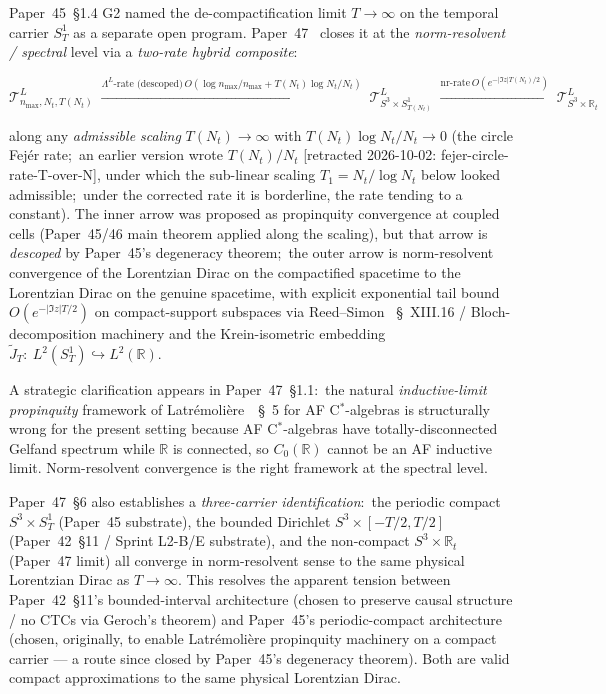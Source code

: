 \documentclass[11pt,a4paper]{article}
\theoremstyle{plain}
\theoremstyle{definition}
\newcommand{\nmax}{n_{\max}}
\newcommand{\Nt}{N_{t}}
\newcommand{\sthree}{S^{3}}
\newcommand{\Tcal}{\mathcal{T}}
\newcommand{\R}{\mathbb{R}}
\newcommand{\Lprop}{\Lambda^{L}}
\newcommand{\Sone}{S^{1}}
\begin{document}
Paper~45~\S 1.4 G2 named the de-compactification limit
$T \to \infty$ on the temporal carrier $\Sone_{T}$ as a separate
open program.  Paper~47~\cite{paper47} closes it at the \emph{norm-resolvent / spectral} level via a \emph{two-rate hybrid composite}:

\begin{equation}\label{eq:p47_composite}
\Tcal^{L}_{\nmax, \Nt, T(\Nt)}
\;\xrightarrow{\Lprop\text{-rate (descoped)}\,
O(\log\nmax/\nmax + T(\Nt)\log\Nt/\Nt)}\;
\Tcal^{L}_{\sthree \times \Sone_{T(\Nt)}}
\;\xrightarrow{\mathrm{nr}\text{-rate}\,
O(e^{-|\Im z|T(\Nt)/2})}\;
\Tcal^{L}_{\sthree \times \R_{t}}
\end{equation}

along any \emph{admissible scaling} $T(\Nt) \to \infty$ with
$T(\Nt)\log\Nt/\Nt \to 0$ (the circle Fej\'er rate;\ an earlier version wrote
$T(\Nt)/\Nt$ [retracted 2026-10-02: fejer-circle-rate-T-over-N], under which the sub-linear scaling $T_{1} = \Nt/\log\Nt$
below looked admissible;\ under the corrected rate it is borderline, the
rate tending to a constant).  The inner arrow was proposed as propinquity convergence at
coupled cells (Paper~45/46 main theorem applied along the scaling), but
that arrow is \emph{descoped} by Paper~45's degeneracy theorem;\
the outer arrow is norm-resolvent convergence of the Lorentzian Dirac
on the compactified spacetime to the Lorentzian Dirac on the genuine
spacetime, with explicit exponential tail bound
$O(e^{-|\Im z|T/2})$ on compact-support subspaces via Reed--Simon
\cite{reed_simon_iv}~\S~XIII.16 / Bloch-decomposition machinery and
the Krein-isometric embedding $\widetilde J_{T}:\
L^{2}(\Sone_{T}) \hookrightarrow L^{2}(\R)$.

A strategic clarification appears in Paper~47~\S 1.1:\ the natural
\emph{inductive-limit propinquity} framework of
Latr\'emoli\`ere~\cite{latremoliere2018}~\S~5 for AF C$^{*}$-algebras
is structurally wrong for the present setting because AF
C$^{*}$-algebras have totally-disconnected Gelfand spectrum while
$\R$ is connected, so $C_{0}(\R)$ cannot be an AF inductive limit.
Norm-resolvent convergence is the right framework at the spectral
level.

Paper~47~\S 6 also establishes a \emph{three-carrier identification}:\
the periodic compact $\sthree \times \Sone_{T}$ (Paper~45 substrate),
the bounded Dirichlet $\sthree \times [-T/2, T/2]$
(Paper~42~\S 11 / Sprint L2-B/E substrate), and the non-compact
$\sthree \times \R_{t}$ (Paper~47 limit) all converge in norm-resolvent
sense to the same physical Lorentzian Dirac as $T \to \infty$.  This
resolves the apparent tension between Paper~42~\S 11's bounded-interval
architecture (chosen to preserve causal structure / no CTCs via
Geroch's theorem) and Paper~45's periodic-compact architecture (chosen,
originally, to enable Latr\'emoli\`ere propinquity machinery on a compact
carrier --- a route since closed by Paper~45's degeneracy theorem).  Both are valid compact approximations to the same physical
Lorentzian Dirac.
\end{document}
